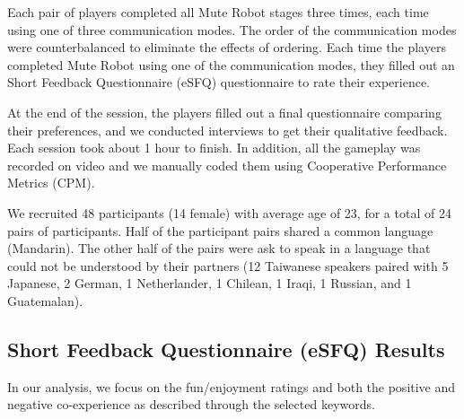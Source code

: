 Each pair of players completed all Mute Robot stages three times, each time using one of three communication modes. The order of the communication modes were counterbalanced to eliminate the effects of ordering.
Each time the players completed Mute Robot using one of the communication modes, they filled out an Short Feedback Questionnaire (eSFQ)\cite{eSFQ} questionnaire to rate their experience. 

At the end of the session, the players filled out a final questionnaire comparing their preferences, and we conducted interviews to get their qualitative feedback. Each session took about 1 hour to finish. 
In addition, all the gameplay was recorded on video and we manually coded them using Cooperative Performance Metrics (CPM)\cite{CPMs}. 

We recruited 48 participants (14 female) with average age of 23, for a total of 24 pairs of participants. Half of the participant pairs shared a common language (Mandarin). The other half of the pairs were ask to speak in a language that could not be understood by their partners (12 Taiwanese speakers paired with 5 Japanese, 2 German, 1 Netherlander, 1 Chilean, 1 Iraqi, 1 Russian, and 1 Guatemalan).
  








\subsection{Short Feedback Questionnaire (eSFQ) Results}
In our analysis, we focus on the fun/enjoyment ratings and both the positive and negative co-experience as described through the selected keywords. 


